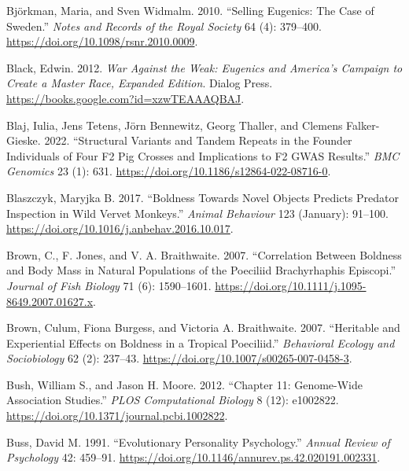 \documentclass[
]{book}
\newlength{\cslhangindent}
\newlength{\cslentryspacingunit} %
\newenvironment{CSLReferences}[2] %
 {%
  \setlength{\parindent}{0pt}
  \ifodd #1
  \let\oldpar\par
  \def\par{\hangindent=\cslhangindent\oldpar}
  \fi
  \setlength{\parskip}{#2\cslentryspacingunit}
 }%
 {}
\begin{document}
\begin{CSLReferences}{1}{0}
\leavevmode{}%
Björkman, Maria, and Sven Widmalm. 2010. {``Selling Eugenics: The Case of {Sweden}.''} \emph{Notes and Records of the Royal Society} 64 (4): 379--400. \url{https://doi.org/10.1098/rsnr.2010.0009}.

\leavevmode{}%
Black, Edwin. 2012. \emph{War {Against} the {Weak}: {Eugenics} and {America}'s {Campaign} to {Create} a {Master Race}, {Expanded Edition}}. {Dialog Press}. \url{https://books.google.com?id=xzwTEAAAQBAJ}.

\leavevmode{}%
Blaj, Iulia, Jens Tetens, Jörn Bennewitz, Georg Thaller, and Clemens Falker-Gieske. 2022. {``Structural Variants and Tandem Repeats in the Founder Individuals of Four {F2} Pig Crosses and Implications to {F2 GWAS} Results.''} \emph{BMC Genomics} 23 (1): 631. \url{https://doi.org/10.1186/s12864-022-08716-0}.

\leavevmode{}%
Blaszczyk, Maryjka B. 2017. {``Boldness Towards Novel Objects Predicts Predator Inspection in Wild Vervet Monkeys.''} \emph{Animal Behaviour} 123 (January): 91--100. \url{https://doi.org/10.1016/j.anbehav.2016.10.017}.

\leavevmode{}%
Brown, C., F. Jones, and V. A. Braithwaite. 2007. {``Correlation Between Boldness and Body Mass in Natural Populations of the Poeciliid {Brachyrhaphis} Episcopi.''} \emph{Journal of Fish Biology} 71 (6): 1590--1601. \url{https://doi.org/10.1111/j.1095-8649.2007.01627.x}.

\leavevmode{}%
Brown, Culum, Fiona Burgess, and Victoria A. Braithwaite. 2007. {``Heritable and Experiential Effects on Boldness in a Tropical Poeciliid.''} \emph{Behavioral Ecology and Sociobiology} 62 (2): 237--43. \url{https://doi.org/10.1007/s00265-007-0458-3}.

\leavevmode{}%
Bush, William S., and Jason H. Moore. 2012. {``Chapter 11: {Genome-Wide Association Studies}.''} \emph{PLOS Computational Biology} 8 (12): e1002822. \url{https://doi.org/10.1371/journal.pcbi.1002822}.

\leavevmode{}%
Buss, David M. 1991. {``Evolutionary Personality Psychology.''} \emph{Annual Review of Psychology} 42: 459--91. \url{https://doi.org/10.1146/annurev.ps.42.020191.002331}.


\end{CSLReferences}
\end{document}
